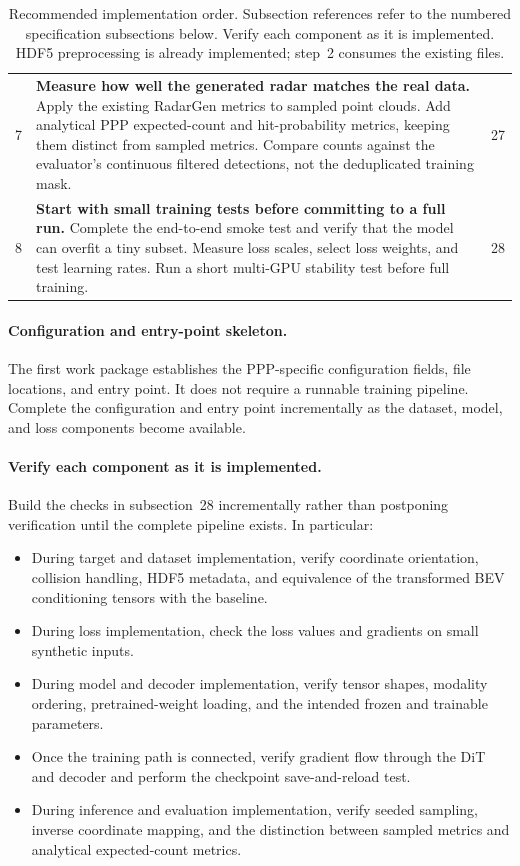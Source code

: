 \documentclass[11pt,a4paper]{article}
\begin{document}
\begin{table}[htbp]
\begin{tabularx}{\textwidth}{@{}c X p{2.7cm}@{}}
7 &
\textbf{Measure how well the generated radar matches the real data.}
Apply the existing RadarGen metrics to sampled point clouds.
Add analytical PPP expected-count and hit-probability metrics,
keeping them distinct from sampled metrics.
Compare counts against the evaluator's continuous filtered
detections, not the deduplicated training mask. &
27 \\

8 &
\textbf{Start with small training tests before committing to
a full run.}
Complete the end-to-end smoke test and verify that the model
can overfit a tiny subset.
Measure loss scales, select loss weights, and test learning rates.
Run a short multi-GPU stability test before full training. &
28 \\

\bottomrule
\end{tabularx}
\caption{Recommended implementation order.
Subsection references refer to the numbered specification
subsections below. Verify each component as it is implemented.
HDF5 preprocessing is already implemented; step~2 consumes
the existing files.}
\end{table}
\paragraph{Configuration and entry-point skeleton.}
The first work package establishes the PPP-specific configuration
fields, file locations, and entry point. It does not require a runnable
training pipeline. Complete the configuration and entry point
incrementally as the dataset, model, and loss components become available.

\paragraph{Verify each component as it is implemented.}
Build the checks in subsection~28 incrementally rather than postponing
verification until the complete pipeline exists. In particular:
\begin{itemize}
    \item During target and dataset implementation, verify coordinate
    orientation, collision handling, HDF5 metadata, and equivalence of
    the transformed BEV conditioning tensors with the baseline.
    \item During loss implementation, check the loss values and gradients
    on small synthetic inputs.
    \item During model and decoder implementation, verify tensor shapes,
    modality ordering, pretrained-weight loading, and the intended
    frozen and trainable parameters.
    \item Once the training path is connected, verify gradient flow
    through the DiT and decoder and perform the checkpoint
    save-and-reload test.
    \item During inference and evaluation implementation, verify seeded
    sampling, inverse coordinate mapping, and the distinction between
    sampled metrics and analytical expected-count metrics.
\end{itemize}
\end{document}
